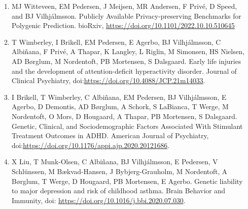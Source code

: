 \begin{enumerate}
	\item MJ Witteveen, EM Pedersen, J Meijsen, MR Andersen, F Privé, D Speed, and BJ Vilhjálmsson. Publicly Available Privacy-preserving Benchmarks for Polygenic Prediction. bioRxiv, \url{https://doi.org/10.1101/2022.10.10.510645}
	\item T Wimberley, I Brikell, EM Pedersen, E Agerbo, BJ Vilhjálmsson, C Albiñana, F Privé, A Thapar, K Langley, L Riglin, M Simonsen, HS Nielsen, AD Børglum, M Nordentoft, PB Mortensen, S Dalsgaard. Early life injuries and the development of attention-deficit hyperactivity disorder.  Journal of Clinical Psychiatry, doi:\url{https://doi.org/10.4088/JCP.21m14033}.
	\item I Brikell, T Wimberley, C Albiñana, EM Pedersen, BJ Vilhjálmsson, E Agerbo, D Demontis, AD Børglum, A Schork, S LaBianca, T Werge, M Nordentoft, O Mors, D Hougaard, A Thapar, PB Mortensen, S Dalsgaard. Genetic, Clinical, and Sociodemographic Factors Associated With Stimulant Treatment Outcomes in ADHD.  American Journal of Psychiatry, doi:\url{https://doi.org/10.1176/appi.ajp.2020.20121686}.
	\item X Liu, T Munk-Olsen, C Albiñana, BJ Vilhjálmsson, E Pedersen, V Schlünssen, M Bækvad-Hansen, J Bybjerg-Grauholm, M Nordentoft, A Børglum, T Werge, D Hougaard, PB Mortensen, E Agerbo. Genetic liability to major depression and risk of childhood asthma. Brain Behavior and Immunity, doi: \url{https://doi.org/10.1016/j.bbi.2020.07.030}.
	
\end{enumerate}
